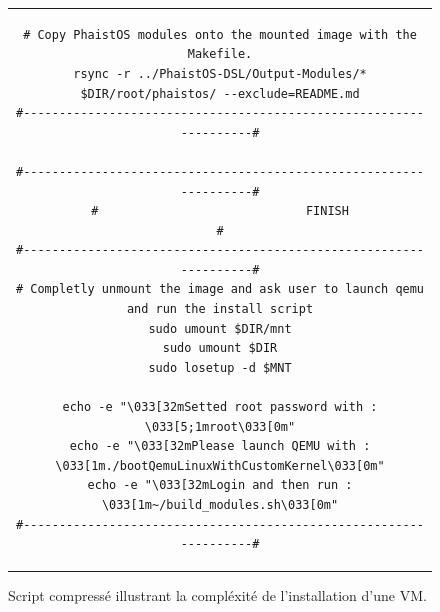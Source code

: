 \begin{figure}[h!t]
\begin{tabular}{c}
\begin{lstlisting}[style=customShell, linewidth=0.9\textwidth]
# Copy PhaistOS modules onto the mounted image with the Makefile.
rsync -r ../PhaistOS-DSL/Output-Modules/* $DIR/root/phaistos/ --exclude=README.md
#------------------------------------------------------------------#

#------------------------------------------------------------------#
#                             FINISH                               #
#------------------------------------------------------------------#
# Completly unmount the image and ask user to launch qemu and run the install script
sudo umount $DIR/mnt
sudo umount $DIR
sudo losetup -d $MNT

echo -e "\033[32mSetted root password with : \033[5;1mroot\033[0m"
echo -e "\033[32mPlease launch QEMU with : \033[1m./bootQemuLinuxWithCustomKernel\033[0m"
echo -e "\033[32mLogin and then run : \033[1m~/build_modules.sh\033[0m"
#------------------------------------------------------------------#
        \end{lstlisting}
    \end{tabular}
    \caption{Script compressé illustrant la compléxité de l'installation d'une VM.}
    \label{fig:script}
\end{figure}